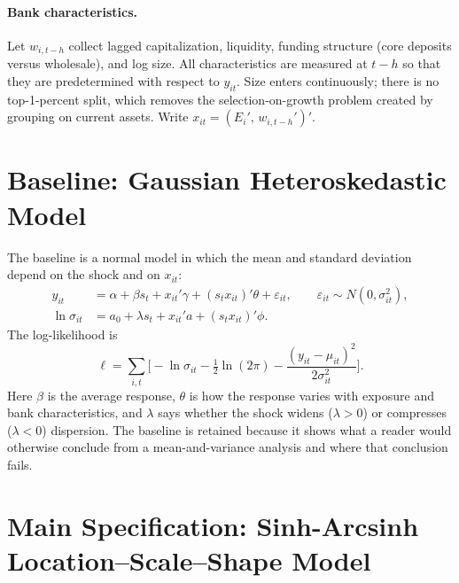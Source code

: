 \documentclass[11pt]{article}
\begin{document}
\paragraph{Bank characteristics.} Let $w_{i,t-h}$ collect lagged capitalization, liquidity, funding structure (core deposits versus wholesale), and log size. All characteristics are measured at $t-h$ so that they are predetermined with respect to $y_{it}$. Size enters continuously; there is no top-1-percent split, which removes the selection-on-growth problem created by grouping on current assets. Write $x_{it}=(E_i',\,w_{i,t-h}')'$.

\section{Baseline: Gaussian Heteroskedastic Model}

The baseline is a normal model in which the mean and standard deviation depend on the shock and on $x_{it}$:
\begin{align}
  y_{it} &= \alpha + \beta s_t + x_{it}'\gamma + (s_t x_{it})'\theta + \varepsilon_{it}, \qquad \varepsilon_{it}\sim N(0,\sigma_{it}^2), \label{eq:gmean}\\
  \ln\sigma_{it} &= a_0 + \lambda s_t + x_{it}'a + (s_t x_{it})'\phi. \label{eq:gscale}
\end{align}
The log-likelihood is
\begin{equation}
  \ell=\sum_{i,t}\Big[-\ln\sigma_{it}-\tfrac12\ln(2\pi)-\frac{(y_{it}-\mu_{it})^2}{2\sigma_{it}^2}\Big]. \label{eq:gll}
\end{equation}
Here $\beta$ is the average response, $\theta$ is how the response varies with exposure and bank characteristics, and $\lambda$ says whether the shock widens ($\lambda>0$) or compresses ($\lambda<0$) dispersion. The baseline is retained because it shows what a reader would otherwise conclude from a mean-and-variance analysis and where that conclusion fails.

\section{Main Specification: Sinh-Arcsinh Location--Scale--Shape Model}
\end{document}
